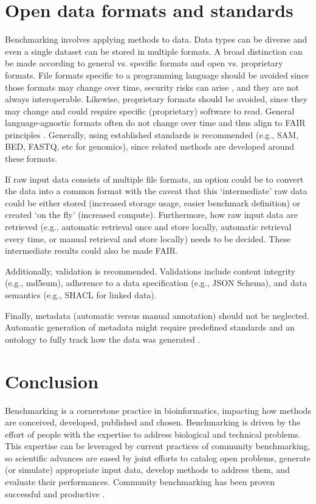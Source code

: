 \documentclass[11pt]{article}
\begin{document}
\section*{Open data formats and standards}

Benchmarking involves applying methods to data. Data types can be diverse and even a single dataset can be stored in multiple formats. A broad distinction can be made according to general vs. specific formats and open vs. proprietary formats. File formats specific to a programming language should be avoided since those formats may change over time, security risks can arise \cite{Huynh2023-pq, Bleih2024-lv}, and they are not always interoperable. Likewise, proprietary formats should be avoided, since they may change and could require specific (proprietary) software to read. General language-agnostic formats often do not change over time and thus align to FAIR principles \cite{Wilkinson2016-bh}. Generally, using established standards is recommended (e.g., SAM, BED, FASTQ, etc for genomics), since related methods are developed around these formats.

If raw input data consists of multiple file formats, an option could be to convert the data into a common format with the caveat that this `intermediate' raw data could be either stored (increased storage usage, easier benchmark definition) or created `on the fly' (increased compute). Furthermore, how raw input data are retrieved (e.g., automatic retrieval once and store locally, automatic retrieval every time, or manual retrieval and store locally) needs to be decided. These intermediate results could also be made FAIR.

Additionally, validation is recommended. Validations include content integrity (e.g., md5sum), adherence to a data specification (e.g., JSON Schema), and data semantics (e.g., SHACL for linked data). 

Finally, metadata (automatic versus manual annotation) should not be neglected. Automatic generation of metadata might require predefined standards and an ontology to fully track how the data was generated \cite{LeboUnknown-om}. 

\section*{Conclusion}
\label{sec:conclusion}

Benchmarking is a cornerstone practice in bioinformatics, impacting how methods are conceived, developed, published and chosen. Benchmarking is driven by the effort of people with the expertise to address biological and technical problems. This expertise can be leveraged by current practices of community benchmarking, so scientific advances are eased by joint efforts to catalog open problems, generate (or simulate) appropriate input data, develop methods to address them, and evaluate their performances. Community benchmarking has been proven successful and  productive \cite{Moult2005-ne,Capella-Gutierrez2017-dh,Luecken2024-fk}.
\end{document}
